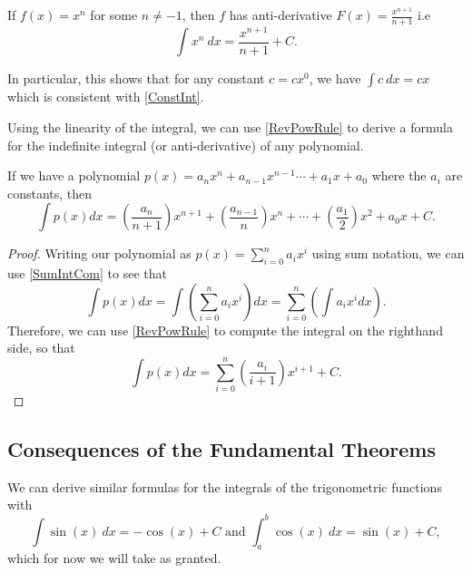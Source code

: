 \begin{prop}\label{RevPowRule}
  If $f(x)=x^n$ for some $n\neq -1$, then $f$ has anti-derivative $F(x)=\frac{x^{n+1}}{n+1}$ i.e
  \begin{equation}
    \int x^n\ dx=\frac{x^{n+1}}{n+1}+C.
  \end{equation}
\end{prop}

\begin{rem}
  In particular, this shows that for any constant $c=cx^0$, we have $\int c\ dx=cx$ which is consistent with \cref{ConstInt}.
\end{rem}

Using the linearity of the integral, we can use \cref{RevPowRule} to derive a formula for the indefinite integral (or anti-derivative) of any polynomial.
\begin{cor}\label{PolyInt}
If we have a polynomial $p(x)=a_nx^n+a_{n-1}x^{n-1}\dotsb+a_1x+a_0$ where the $a_i$ are constants, then
\begin{equation}
  \int p(x)dx= \left(\frac{a_n}{n+1}\right)x^{n+1}+ \left(\frac{a_{n-1}}{n}\right)x^{n}+\dotsb+\left(\frac{a_1}{2}\right)x^2+a_0x+C.
\end{equation}
\begin{proof}
  Writing our polynomial as $p(x)=\sum_{i=0}^{n}a_ix^i$ using sum notation, we can use \cref{SumIntCom} to see that
  \begin{equation}
    \int p(x)dx= \int \left(\sum_{i=0}^{n}a_ix^i\right)dx=\sum_{i=0}^{n}\left( \int a_ix^i dx \right).
  \end{equation}
  Therefore, we can use \cref{RevPowRule} to compute the integral on the righthand side, so that
  \begin{equation}
      \int p(x)dx=\sum_{i=0}^{n}\left( \frac{ a_i}{i+1}\right) x^{i+1}+C.
  \end{equation}
\end{proof}
\end{cor}

\subsection{Consequences of the Fundamental Theorems}


We can derive similar formulas for the integrals of the trigonometric functions with
\begin{equation}
  \int\sin(x)\ dx= -\cos(x)+C
 \text{ and }   \int_{a}^{b}\cos(x)\ dx=\sin(x)+C,
\end{equation}
which for now we will take as granted.

